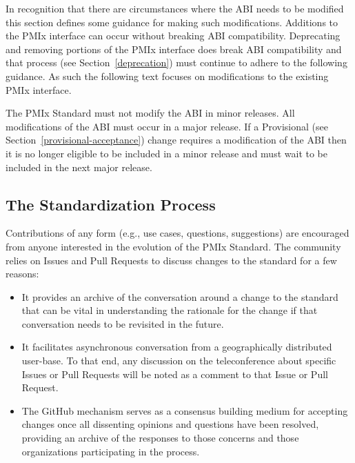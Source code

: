 \documentclass{article}
\begin{document}
In recognition that there are circumstances where the \ac{ABI} needs to be modified this section defines some guidance for making such modifications.
Additions to the PMIx interface can occur without breaking \ac{ABI} compatibility.
Deprecating and removing portions of the PMIx interface does break \ac{ABI} compatibility and that process (see Section~\ref{deprecation}) must continue to adhere to the following guidance.
As such the following text focuses on modifications to the existing PMIx interface.

The PMIx Standard must not modify the \ac{ABI} in minor releases.
All modifications of the \ac{ABI} must occur in a major release.
If a Provisional (see Section~\ref{provisional-acceptance}) change requires a modification of the \ac{ABI} then it is no longer eligible to be included in a minor release and must wait to be included in the next major release.


\hypertarget{the-standardization-process}{%
\subsection{The Standardization Process}%
\label{the-standardization-process}}

Contributions of any form (e.g., use cases, questions, suggestions) are
encouraged from anyone interested in the evolution of the PMIx Standard.
The community relies on Issues and Pull Requests to discuss changes to
the standard for a few reasons:

\begin{itemize}
\item
  It provides an archive of the conversation around a change to the
  standard that can be vital in understanding the rationale for the
  change if that conversation needs to be revisited in the future.
\item
  It facilitates asynchronous conversation from a geographically
  distributed user-base. To that end, any discussion on the
  teleconference about specific Issues or Pull Requests will be noted as
  a comment to that Issue or Pull Request.
\item
  The GitHub mechanism serves as a consensus building medium for
  accepting changes once all dissenting opinions and questions have been
  resolved, providing an archive of the responses to those concerns and
  those organizations participating in the process.
\end{itemize}
\end{document}
